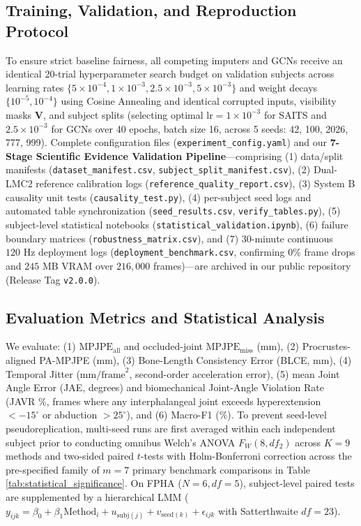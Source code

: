 \documentclass[10pt,twocolumn]{article}
\begin{document}
\subsection{Training, Validation, and Reproduction Protocol}
To ensure strict baseline fairness, all competing imputers and GCNs receive an identical 20-trial hyperparameter search budget on validation subjects across learning rates $\{5\times 10^{-4}, 1\times 10^{-3}, 2.5\times 10^{-3}, 5\times 10^{-3}\}$ and weight decays $\{10^{-5}, 10^{-4}\}$ using Cosine Annealing and identical corrupted inputs, visibility masks $\mathbf{V}$, and subject splits (selecting optimal $\text{lr}=1\times 10^{-3}$ for SAITS \cite{du2023saits} and $2.5\times 10^{-3}$ for GCNs over 40 epochs, batch size 16, across 5 seeds: 42, 100, 2026, 777, 999). Complete configuration files (\texttt{experiment\_config.yaml}) and our \textbf{7-Stage Scientific Evidence Validation Pipeline}---comprising (1) data/split manifests (\texttt{dataset\_manifest.csv}, \texttt{subject\_split\_manifest.csv}), (2) Dual-LMC2 reference calibration logs (\texttt{reference\_quality\_report.csv}), (3) System B causality unit tests (\texttt{causality\_test.py}), (4) per-subject seed logs and automated table synchronization (\texttt{seed\_results.csv}, \texttt{verify\_tables.py}), (5) subject-level statistical notebooks (\texttt{statistical\_validation.ipynb}), (6) failure boundary matrices (\texttt{robustness\_matrix.csv}), and (7) 30-minute continuous $120\text{ Hz}$ deployment logs (\texttt{deployment\_benchmark.csv}, confirming $0\%$ frame drops and $245\text{ MB}$ VRAM over $216,000$ frames)---are archived in our public repository (Release Tag \texttt{v2.0.0}).

\subsection{Evaluation Metrics and Statistical Analysis}
We evaluate: (1) $\text{MPJPE}_{\text{all}}$ and occluded-joint $\text{MPJPE}_{\text{miss}}$ (mm), (2) Procrustes-aligned PA-MPJPE (mm), (3) Bone-Length Consistency Error (BLCE, mm), (4) Temporal Jitter ($\text{mm/frame}^2$, second-order acceleration error), (5) mean Joint Angle Error (JAE, degrees) and biomechanical Joint-Angle Violation Rate (JAVR $\%$, frames where any interphalangeal joint exceeds hyperextension $<-15^\circ$ or abduction $>25^\circ$), and (6) Macro-F1 ($\%$). To prevent seed-level pseudoreplication, multi-seed runs are first averaged within each independent subject prior to conducting omnibus Welch's ANOVA $F_W(8, df_2)$ across $K=9$ methods and two-sided paired $t$-tests with Holm-Bonferroni correction across the pre-specified family of $m=7$ primary benchmark comparisons in Table \ref{tab:statistical_significance}. On FPHA ($N=6, df=5$), subject-level paired tests are supplemented by a hierarchical LMM ($y_{ijk} = \beta_0 + \beta_1\text{Method}_i + u_{\text{subj}(j)} + v_{\text{seed}(k)} + \epsilon_{ijk}$ with Satterthwaite $df=23$).
\end{document}
